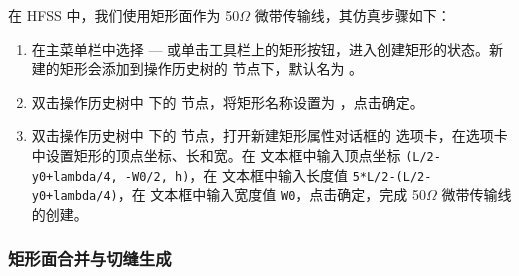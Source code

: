 \documentclass[12pt,a4paper,UTF8]{article}
\begin{document}
在 HFSS 中，我们使用矩形面作为 50$\Omega$ 微带传输线，其仿真步骤如下：

\begin{enumerate}
    \item 在主菜单栏中选择 — 或单击工具栏上的矩形按钮，进入创建矩形的状态。新建的矩形会添加到操作历史树的  节点下，默认名为 。
    
    \item 双击操作历史树中  下的  节点，将矩形名称设置为 ，点击确定。
    
    \item 双击操作历史树中  下的  节点，打开新建矩形属性对话框的  选项卡，在选项卡中设置矩形的顶点坐标、长和宽。在  文本框中输入顶点坐标 \texttt{(L/2-y0+lambda/4, -W0/2, h)}，在  文本框中输入长度值 \texttt{5*L/2-(L/2-y0+lambda/4)}，在  文本框中输入宽度值 \texttt{W0}，点击确定，完成 50$\Omega$ 微带传输线的创建。
\end{enumerate}

\subsubsection{矩形面合并与切缝生成}
\end{document}
